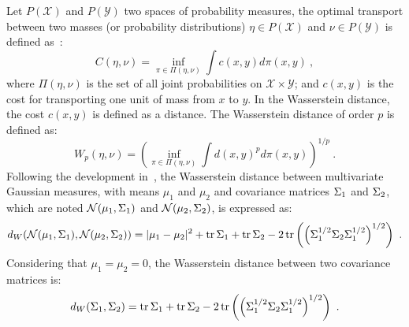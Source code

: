 Let $P(\mathcal{X})$ and $P(\mathcal{Y})$ two spaces of probability measures,
the optimal transport between two masses (or probability distributions) $\eta \in P(\mathcal{X})$ and $\nu \in P(\mathcal{Y})$ is defined as~\cite{VIL08}:
\begin{equation}
C(\eta, \nu) = \inf_{\pi \in \Pi(\eta,\nu)} \int c(x,y) d \pi(x,y) \ ,
\label{eq:opttrans}
\end{equation}
where $\Pi(\eta, \nu)$ is the set of all joint probabilities on $\mathcal{X} \times \mathcal{Y}$; and $c(x,y)$ is the cost for transporting one unit of mass from $x$ to $y$.
In the Wasserstein distance, the cost $c(x,y)$ is defined as a distance. 
The Wasserstein distance of order $p$ is defined as:
\begin{equation}
W_p(\eta,\nu) =  \left( \inf_{\pi \in \Pi(\eta,\nu)} \int d(x,y)^p d\pi(x,y) \right)^{1/p} \ .
\label{eq:wasser}
\end{equation}
Following the development in~\cite{barbaresco_geometric_2011}, the Wasserstein distance between multivariate Gaussian measures, with means $\mu_1$ and $\mu_2$ and covariance matrices $\P_1$ and $\P_2$, which are noted $\mathcal{N}(\mu_1, \P_1)$ and $\mathcal{N}(\mu_2, \P_2)$, is expressed as:
\begin{equation}
d_W(\mathcal{N}(\mu_1, \P_1), \mathcal{N}(\mu_2, \P_2)) = |\mu_1 -\mu_2|^2 + \tr \P_1 + \tr \P_2 - 2 \tr \left( \left( \P_1^{1/2} \P_2 \P_1^{1/2} \right)^{1/2} \right) \ .
\label{eq:dist_wass}
\end{equation}
Considering that $\mu_1 = \mu_2 =0$, the Wasserstein distance between two covariance matrices is:
\begin{equation}
d_W(\P_1, \P_2) = \tr \P_1 + \tr \P_2 - 2 \tr \left( \left( \P_1^{1/2} \P_2 \P_1^{1/2} \right)^{1/2} \right) \ .
\label{eq:dist_wass_2}
\end{equation}


